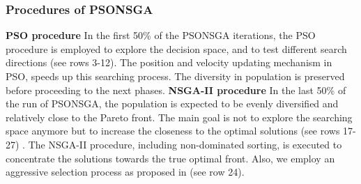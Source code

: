 \documentclass[10pt,journal,compsoc]{IEEEtran}
\begin{document}
 \subsubsection{Procedures of PSONSGA}
\textbf{PSO procedure}
In the first 50\% of the PSONSGA iterations, the PSO procedure is employed to explore the decision space, and to test different search directions (see rows 3-12). The position and velocity updating mechanism in PSO, speeds up this searching process. The diversity in population is preserved before proceeding to the next phases. 
\textbf{NSGA-II procedure}
In the last 50\% of the run of PSONSGA, the population is expected to be evenly diversified and relatively close to the Pareto front. The main goal is not to explore the searching space anymore but to increase the closeness to the optimal solutions (see rows 17-27) \cite{concordia}. The NSGA-II procedure, including non-dominated sorting, is executed to concentrate the solutions towards the true optimal front. Also, we employ an aggressive selection process as proposed in \cite{concordia} (see row 24).
\end{document}
